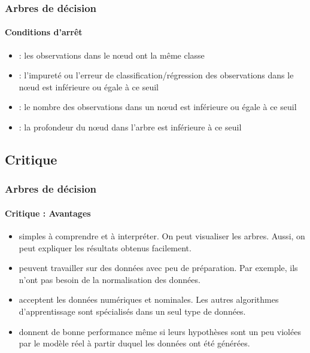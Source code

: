 \documentclass[xcolor=table]{beamer}
\begin{document}
\begin{frame}
	\frametitle{Arbres de décision}
	\framesubtitle{Conditions d'arrêt}
	
	\begin{itemize}
		\item {} : les observations dans le nœud ont la même classe
		\item {} : l'impureté ou l'erreur de classification/régression des observations dans le nœud est inférieure ou égale à ce seuil
		\item {} : le nombre des observations dans un nœud est inférieure ou égale à ce seuil
		\item {} : la profondeur du nœud dans l'arbre est inférieure à ce seuil
	\end{itemize}
	
\end{frame}

\subsection{Critique}

\begin{frame}
	\frametitle{Arbres de décision}
	\framesubtitle{Critique : Avantages}
	
	\begin{itemize}
		\item simples à comprendre et à interpréter. On peut visualiser les arbres. Aussi, on peut expliquer les résultats obtenus facilement.
		\item peuvent travailler sur des données avec peu de préparation. Par exemple, ils n'ont pas besoin de la normalisation des données.
		\item acceptent les données numériques et nominales. Les autres algorithmes d'apprentissage sont spécialisés dans un seul type de données.
		\item donnent de bonne performance même si leurs hypothèses sont un peu violées par le modèle réel à partir duquel les données ont été générées.
	\end{itemize}
	
\end{frame}
\end{document}
